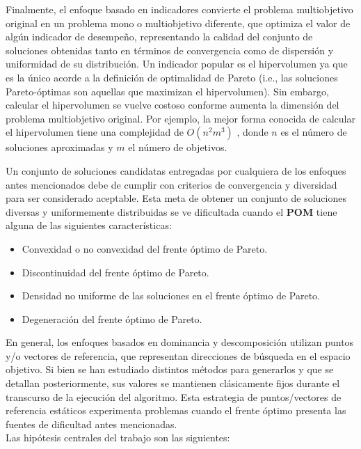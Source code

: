 Finalmente, el enfoque basado en indicadores convierte el problema multiobjetivo original en un problema mono o multiobjetivo diferente, que optimiza el valor de algún indicador de desempeño,
representando la calidad del conjunto de soluciones obtenidas tanto en términos de convergencia como de dispersión y uniformidad de su distribución. Un indicador popular
es el hipervolumen ya que es la único acorde a la definición de  optimalidad de Pareto (i.e., las soluciones Pareto-óptimas son aquellas que maximizan el hipervolumen).
Sin embargo, calcular el hipervolumen se vuelve costoso conforme aumenta la dimensión del problema multiobjetivo original. Por ejemplo, la mejor forma conocida de calcular
el hipervolumen tiene una complejidad de $O(n^2m^3)$ \cite{FonPaqLop06:hypervolume}, donde $n$ es el número de soluciones aproximadas y $m$ el número de objetivos.
\newline

Un conjunto de soluciones candidatas entregadas por cualquiera de los enfoques antes mencionados debe de cumplir con criterios de convergencia y diversidad para ser
considerado aceptable. Esta meta de obtener un conjunto de soluciones diversas y uniformemente distribuidas se ve dificultada cuando el \textbf{POM} tiene alguna de las siguientes características:

\begin{itemize}
 \item Convexidad o no convexidad del frente óptimo de Pareto.
 \item Discontinuidad del frente óptimo de Pareto.
 \item Densidad no uniforme de las soluciones en el frente óptimo de Pareto.
 \item Degeneración del frente óptimo de Pareto.
\end{itemize}

En general, los enfoques basados en dominancia y descomposición utilizan puntos y/o vectores de referencia, que representan direcciones de búsqueda en el espacio objetivo. Si bien se han estudiado distintos métodos para generarlos y que se detallan posteriormente,
sus valores se mantienen clásicamente fijos durante el transcurso de la ejecución del algoritmo. Esta estrategia de puntos/vectores de referencia estáticos experimenta problemas cuando el frente óptimo presenta las fuentes de dificultad antes mencionadas.\\

Las hipótesis centrales del trabajo son las siguientes:

